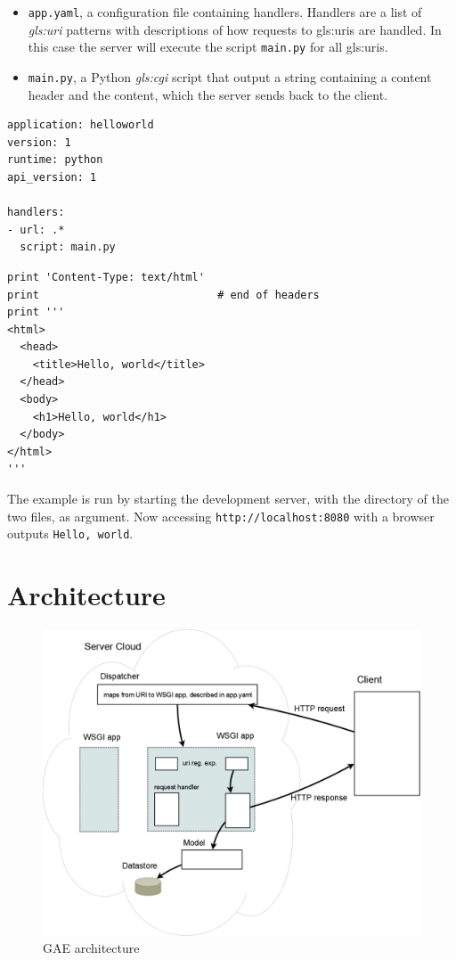 \begin{itemize}
  \item \verb|app.yaml|, a configuration file containing handlers. Handlers are a
  list of \textit{\gls{gls:uri}} patterns with descriptions of how requests to \gls{gls:uri}s are handled. In
  this case the server will execute the script \verb|main.py| for all \gls{gls:uri}s. %
  \item \verb|main.py|, a Python \textit{\gls{gls:cgi}} script that output a
string containing a content header and the content, which the server sends back
to the client.
\end{itemize}

\begin{lstlisting}[caption=app.yaml,label=lst:appYamlHelloWorld]
application: helloworld
version: 1
runtime: python
api_version: 1

handlers:
- url: .*
  script: main.py
\end{lstlisting}


\begin{lstlisting}[caption=main.py,label=lst:helloWorld]
print 'Content-Type: text/html'
print                            # end of headers
print '''
<html>
  <head>
    <title>Hello, world</title>
  </head>
  <body>
    <h1>Hello, world</h1>
  </body>
</html>
'''
\end{lstlisting}

The example is run by starting the development server, with the directory of the
two files, as argument. Now accessing \verb|http://localhost:8080| with a
browser outputs \verb|Hello, world|.

\section{Architecture}
\begin{figure}[htbp]
  \centering
  \includegraphics[width=\textwidth]{./Figures/webappArch}
  \caption{GAE architecture}
  \label{fig:webapp}
\end{figure}

